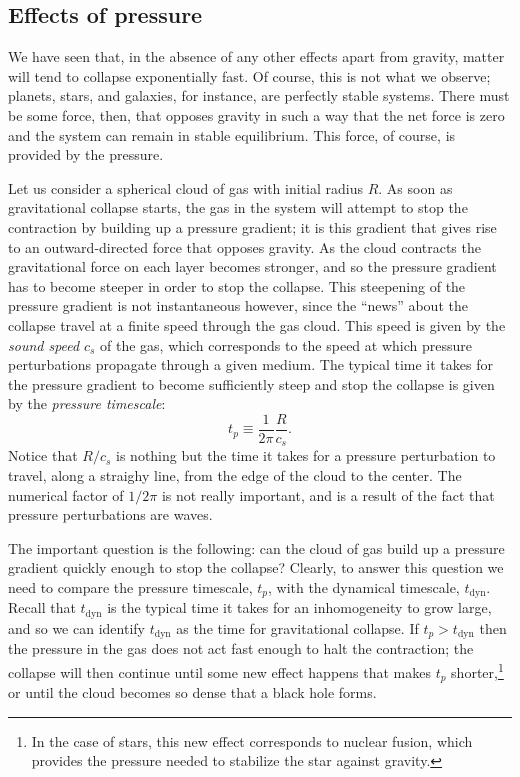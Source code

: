 \subsection{Effects of pressure}

We have seen that, in the absence of any other effects apart from gravity, matter will tend to collapse exponentially fast. Of course, this is not what we observe; planets, stars, and galaxies, for instance, are perfectly stable systems. There must be some force, then, that opposes gravity in such a way that the net force is zero and the system can remain in stable equilibrium. This force, of course, is provided by the pressure.

Let us consider a spherical cloud of gas with initial radius $R$. As soon as gravitational collapse starts, the gas in the system will attempt to stop the contraction by building up a pressure gradient; it is this gradient that gives rise to an outward-directed force that opposes gravity. As the cloud contracts the gravitational force on each layer becomes stronger, and so the pressure gradient has to become steeper in order to stop the collapse. This steepening of the pressure gradient is not instantaneous however, since the ``news'' about the collapse travel at a finite speed through the gas cloud. This speed is given by the {\it sound speed} $c_s$ of the gas, which corresponds to the speed at which pressure perturbations propagate through a given medium. The typical time it takes for the pressure gradient to become sufficiently steep and stop the collapse is given by the {\it pressure timescale}:
\begin{equation}
t_p\equiv \frac{1}{2\pi}\frac{R}{c_s}.
\end{equation}
Notice that $R/c_s$ is nothing but the time it takes for a pressure perturbation to travel, along a straighy line, from the edge of the cloud to the center. The numerical factor of $1/2\pi$ is not really important, and is a result of the fact that pressure perturbations are waves.

The important question is the following: can the cloud of gas build up a pressure gradient quickly enough to stop the collapse? Clearly, to answer this question we need to compare the pressure timescale, $t_p$, with the dynamical timescale, $t_{\mathrm{dyn}}$. Recall that $t_{\mathrm{dyn}}$ is the typical time it takes for an inhomogeneity to grow large, and so we can identify $t_{\mathrm{dyn}}$ as the time for gravitational collapse. If $t_p>t_{\mathrm{dyn}}$ then the pressure in the gas does not act fast enough to halt the contraction; the collapse will then continue until some new effect happens that makes $t_p$ shorter,\footnote{In the case of stars, this new effect corresponds to nuclear fusion, which provides the pressure needed to stabilize the star against gravity.} or until the cloud becomes so dense that a black hole forms.

